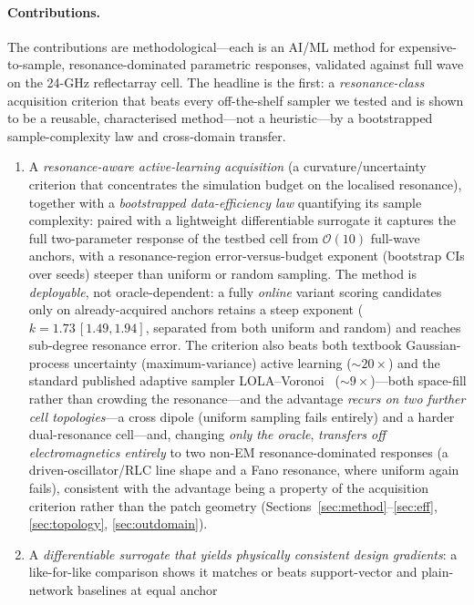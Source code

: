 \documentclass[11pt]{article}
\begin{document}
\paragraph{Contributions.} The contributions are methodological---each is an AI/ML method for
expensive-to-sample, resonance-dominated parametric responses, validated against full wave on the
24-GHz reflectarray cell. The headline is the first: a
\emph{resonance-class} acquisition criterion that beats every off-the-shelf sampler we tested and is shown
to be a reusable, characterised method---not a heuristic---by a bootstrapped sample-complexity law and
cross-domain transfer.
\begin{enumerate}\itemsep1pt
\item A \emph{resonance-aware active-learning acquisition} (a curvature/uncertainty criterion that
concentrates the simulation budget on the localised resonance), together with a \emph{bootstrapped
data-efficiency law} quantifying its sample complexity: paired with a lightweight differentiable
surrogate it captures the full two-parameter response of the testbed cell from $\mathcal{O}(10)$ full-wave
anchors, with a resonance-region error-versus-budget exponent (bootstrap CIs over seeds) steeper than
uniform or random sampling. The method is \emph{deployable}, not oracle-dependent: a fully \emph{online}
variant scoring candidates only on already-acquired anchors retains a steep exponent
($k\!=\!1.73\,[1.49,1.94]$, separated from both uniform and random) and reaches sub-degree resonance
error. The criterion also beats both textbook Gaussian-process uncertainty (maximum-variance) active learning
($\sim\!20\times$) and the standard published adaptive sampler LOLA--Voronoi~\cite{crombecq2011}
($\sim\!9\times$)---both space-fill rather than crowding the resonance---and the advantage \emph{recurs on
two further cell topologies}---a cross dipole (uniform sampling fails entirely) and a harder dual-resonance
cell---and, changing \emph{only the oracle}, \emph{transfers off electromagnetics entirely} to two non-EM
resonance-dominated responses (a driven-oscillator/RLC line shape and a Fano resonance, where uniform again
fails), consistent with the advantage being a property of the acquisition criterion rather than the
patch geometry (Sections~\ref{sec:method}--\ref{sec:eff}, \ref{sec:topology}, \ref{sec:outdomain}).
\item A \emph{differentiable surrogate that yields physically consistent design gradients}: a like-for-like
comparison shows it matches or beats support-vector and plain-network baselines at equal anchor

\end{enumerate}
\end{document}
